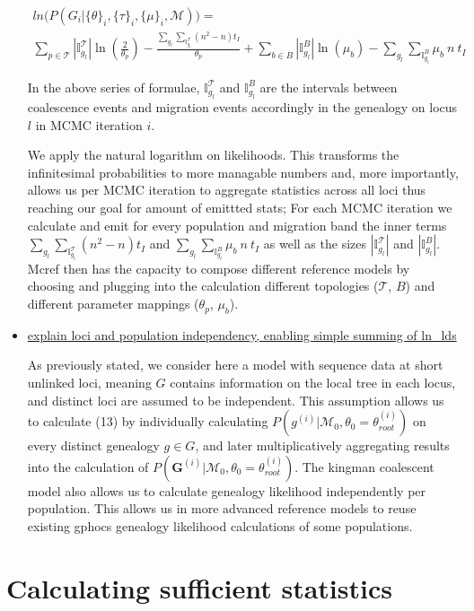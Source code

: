 \documentclass[11pt]{article}
\newcommand{\vect}[1]{\boldsymbol{\mathbf{#1}}}
\newcommand{\M}{\mathcal{M}}
\newcommand{\Tr}{\mathcal{T}}
\newcommand{\G}{\vect{G}}
\newcommand{\It}{\mathbb{I}_{g_l}^{\Tr}}
\newcommand{\Ib}{\mathbb{I}_{g_l}^B}
\newcommand{\troot}{\theta_{root}}
\begin{document}
\begin{itemize}
\begin{align}
ln{\big(P(G_i|\{\theta\}_i, \{\tau\}_i, \{\mu\}_i, \M)\big)} =~~  \\
\sum_{p\in\Tr}|\It|\ln{(\frac{2}{\theta_p})} - \frac{\sum_{g_l}\sum_{\It}(n^2-n)t_I}{\theta_p} + \sum_{b\in B}|\Ib|\ln{(\mu_b)} - \sum_{g_l}\sum_{\Ib}\mu_b~ n~t_I
\label{eq:is_harmonic}
\end{align}


In the above series of formulae, $\It$ and $\Ib$ are the intervals between coalescence events and migration events accordingly in the genealogy on locus $l$ in MCMC iteration $i$. 

We apply the natural logarithm on likelihoods. This transforms the infinitesimal probabilities to more managable numbers and, more importantly, allows us per MCMC iteration to aggregate statistics across all loci thus reaching our goal for amount of emittted stats; For each MCMC iteration we calculate and emit for every population and migration band the inner terms $\sum_{g_l}\sum_{\It}(n^2-n)t_I $ and $\sum_{g_l}\sum_{\Ib}\mu_b~ n~t_I$ as well as the sizes $|\It|$ and $|\Ib|$.
Mcref then has the capacity to compose different reference models by choosing and plugging into the calculation different topologies ($\Tr$, $B$) and different parameter mappings ($\theta_p$, $\mu_b$).





\item \underline{explain loci and population independency, enabling simple summing of ln\_lds}

As previously stated, we consider here a model with sequence data at short unlinked loci, meaning $G$ contains information on the local tree in each locus, and distinct loci are assumed to be independent. This assumption allows us to calculate (13) by individually calculating $P(g^{(i)} | \M_0, \theta_0=\troot^{(i)})$ on every distinct genealogy $g \in G$, and later multiplicatively aggregating results into the calculation of $P(\G^{(i)}|\M_0,\theta_0=\troot^{(i)})$. The kingman coalescent model also allows us to calculate genealogy likelihood independently per population. This allows us in more advanced reference models to reuse existing gphocs genealogy likelihood calculations of some populations. 


\end{itemize}


\section{Calculating sufficient statistics}
\end{document}
